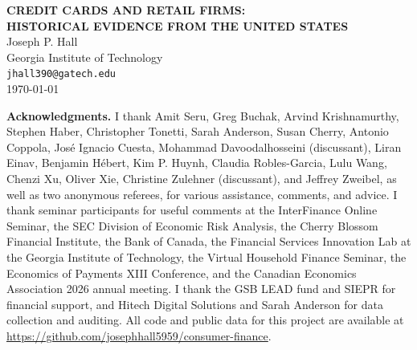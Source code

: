 \documentclass[12pt]{article}
\begin{document}
\thispagestyle{empty}
\begin{center}
{\Large \textbf{CREDIT CARDS AND RETAIL FIRMS:\\ HISTORICAL EVIDENCE FROM THE UNITED STATES}}\\[2em]

{\large Joseph P. Hall}\\[0.5em]
Georgia Institute of Technology\\
\texttt{jhall390@gatech.edu}\\[2em]

\today
\end{center}

\vspace{2em}
\noindent \textbf{Acknowledgments.} I thank Amit Seru, Greg Buchak, Arvind
Krishnamurthy, Stephen Haber, Christopher Tonetti, Sarah Anderson, Susan
Cherry, Antonio Coppola, Jos\'e Ignacio Cuesta, Mohammad Davoodalhosseini
(discussant), Liran Einav, Benjamin H\'ebert, Kim P. Huynh, Claudia
Robles-Garcia, Lulu Wang, Chenzi Xu, Oliver Xie, Christine Zulehner
(discussant), and Jeffrey Zweibel, as well as two anonymous referees, for
various assistance, comments, and advice. I thank seminar participants for
useful comments at the InterFinance Online Seminar, the SEC Division of
Economic Risk Analysis, the Cherry Blossom Financial Institute, the Bank of
Canada, the Financial Services Innovation Lab at the Georgia Institute of
Technology, the Virtual Household Finance Seminar, the Economics of Payments
XIII Conference, and the Canadian Economics Association 2026 annual meeting.
I thank the GSB LEAD fund and SIEPR for financial support, and Hitech Digital
Solutions and Sarah Anderson for data collection and auditing. All code and
public data for this project are available at
\url{https://github.com/josephhall5959/consumer-finance}.
\end{document}
